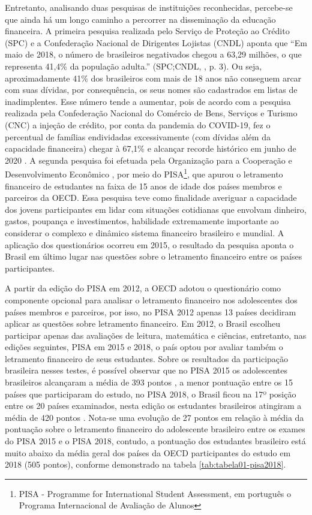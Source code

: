 Entretanto, analisando duas pesquisas de instituições reconhecidas, percebe-se que ainda há um longo caminho a percorrer na disseminação da educação financeira. A primeira pesquisa realizada pelo Serviço de Proteção ao Crédito (SPC) e a Confederação Nacional de Dirigentes Lojistas (CNDL) aponta que “Em maio de 2018, o número de brasileiros negativados chegou a 63,29 milhões, o que representa 41,4\% da população adulta.” (SPC;CNDL, \citeyear{spc2018}, p. 3). Ou seja, aproximadamente 41\% dos brasileiros com mais de 18 anos não conseguem arcar com suas dívidas, por consequência, os seus nomes são cadastrados em listas de inadimplentes. Esse número tende a aumentar, pois de acordo com a pesquisa realizada pela Confederação Nacional do Comércio de Bens, Serviços e Turismo (CNC) a injeção de crédito, por conta da pandemia do COVID-19, fez o percentual de famílias endividadas excessivamente (com dívidas além da capacidade financeira) chegar à 67,1\% e alcançar recorde histórico em junho de 2020 \cite{cnc2020}. A segunda pesquisa foi efetuada pela Organização para a Cooperação e Desenvolvimento Econômico \cite{oecd2017}, por meio do PISA\footnote{PISA - Programme for International Student Assessment, em português o Programa Internacional de Avaliação de Alunos}, que apurou o letramento financeiro de estudantes na faixa de 15 anos de idade dos países membros e parceiros da OECD. Essa pesquisa teve como finalidade averiguar a capacidade dos jovens participantes em lidar com situações cotidianas que envolvam dinheiro, gastos, poupança e investimentos, habilidade extremamente importante ao considerar o complexo e dinâmico sistema financeiro brasileiro e mundial. A aplicação dos questionários ocorreu em 2015, o resultado da pesquisa aponta o Brasil em último lugar nas questões sobre o letramento financeiro entre os países participantes.

A partir da edição do PISA em 2012, a OECD adotou o questionário como componente opcional para analisar o letramento financeiro nos adolescentes dos países membros e parceiros, por isso, no PISA 2012 apenas 13 países decidiram aplicar as questões sobre letramento financeiro. Em 2012, o Brasil escolheu participar apenas das avaliações de leitura, matemática e ciências, entretanto, nas edições seguintes, PISA em 2015 e 2018, o país optou por avaliar também o letramento financeiro de seus estudantes. Sobre os resultados da participação brasileira nesses testes, é possível observar que no PISA 2015 os adolescentes brasileiros alcançaram a média de 393 pontos \cite{oecd2017}, a menor pontuação entre os 15 países que participaram do estudo, no PISA 2018, o Brasil ficou na 17º posição entre os 20 países examinados, nesta edição os estudantes brasileiros atingiram a média de 420 pontos \citeauthor{oecd2020}. Nota-se uma evolução de 27 pontos em relação à média da pontuação sobre o letramento financeiro do adolescente brasileiro entre os exames do PISA 2015 e o PISA 2018, contudo, a pontuação dos estudantes brasileiro está muito abaixo da média geral dos países da OECD participantes do estudo em 2018 (505 pontos), conforme demonstrado na tabela \ref{tab:tabela01-pisa2018}.

